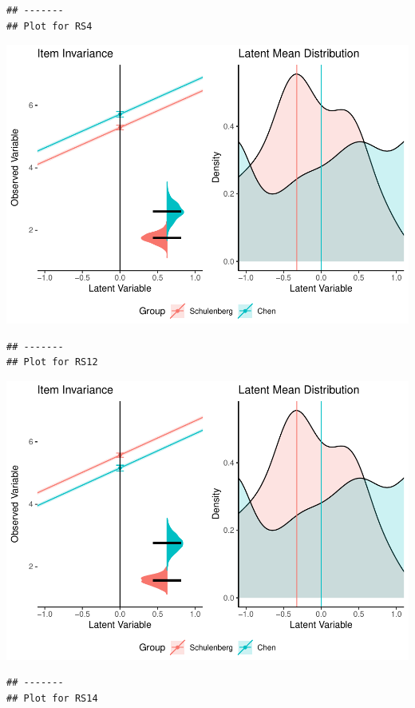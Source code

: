 \documentclass[
  man]{apa7}
\begin{document}
\begin{verbatim}
## -------
## Plot for RS4
\end{verbatim}

\includegraphics{manuscript_files/figure-latex/unnamed-chunk-107-3.pdf}

\begin{verbatim}
## -------
## Plot for RS12
\end{verbatim}

\includegraphics{manuscript_files/figure-latex/unnamed-chunk-107-4.pdf}

\begin{verbatim}
## -------
## Plot for RS14
\end{verbatim}
\end{document}
